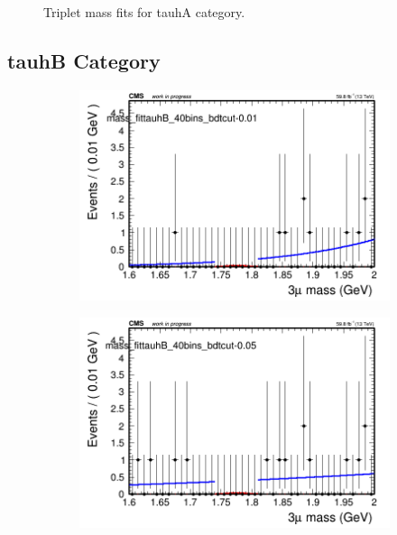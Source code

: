 \begin{figure}[H]
\begin{subfigure}{0.2\textwidth}
        \caption{}
    \end{subfigure}
    \caption{Triplet mass fits for tauhA category.}
    \label{fig:powerlawtauhA}
\end{figure}

\subsection{tauhB Category}
\label{sec:powerlawtauhB}

\begin{figure}[H]
    \centering
    \begin{subfigure}{0.2\textwidth}
        \includegraphics[width=\textwidth]{power_law/plots/tauhB/massfit_tauhB_40bins_bdtcut-0.01.png}
        \caption{}
    \end{subfigure}
    \begin{subfigure}{0.2\textwidth}
        \includegraphics[width=\textwidth]{power_law/plots/tauhB/massfit_tauhB_40bins_bdtcut-0.05.png}

\end{subfigure}
\end{figure}
